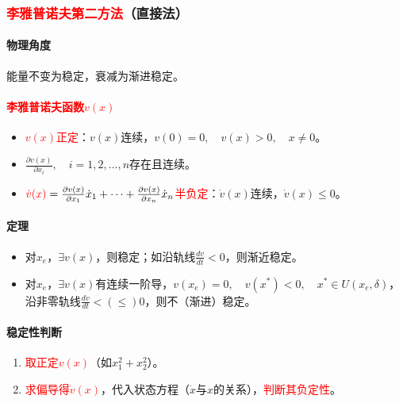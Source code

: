 \documentclass[
12pt, %
a4paper, 
oneside, %
]{scrartcl}
\begin{document}
\subsubsection[李雅普诺夫第二方法]{\textcolor{red}{李雅普诺夫第二方法}（直接法）}
\paragraph{物理角度}
能量不变为稳定，衰减为渐进稳定。
\paragraph{\textcolor{red}{李雅普诺夫函数$ v(x) $}}
\begin{itemize}
\item \textcolor{red}{$ v(x) $正定}：$ v(x) $连续，$ v(0) = 0, \quad v(x) > 0, \quad x \neq 0 $。
\item $ \frac{\partial v(x)}{\partial x_i}, \quad i = 1, 2, \dots, n $存在且连续。
\item $ \textcolor{red}{\dot{v}(x)} = \frac{\partial v(x)}{\partial x_1} \dot{x}_1 + \dots + \frac{\partial v(x)}{\partial x_n} \dot{x}_n $\textcolor{red}{半负定}：$ \dot{v}(x) $连续，$ \dot{v}(x) \leq 0 $。
\end{itemize}
\paragraph{定理}
\begin{itemize}
\item 对$ x_e $，$ \exists v(x) $，则稳定；如沿轨线$ \frac{d v}{d t} < 0 $，则渐近稳定。
\item 对$ x_e $，$ \exists v(x) $有连续一阶导，$ v(x_e) = 0, \quad v(x^*) < 0, \quad x^* \in U(x_e, \delta) $，沿非零轨线$ \frac{d v}{d t} <(\leq) 0 $，则不（渐进）稳定。
\end{itemize}
\paragraph{稳定性判断}
\begin{enumerate}
\item \textcolor{red}{取正定$ v(x) $}（如$ x_1^2 + x_2^2 $）。
\item \textcolor{red}{求偏导得$ \dot{v}(x) $}，代入状态方程（$ \dot{x} $与$ x $的关系），\textcolor{red}{判断其负定性}。
\end{enumerate}
\end{document}
